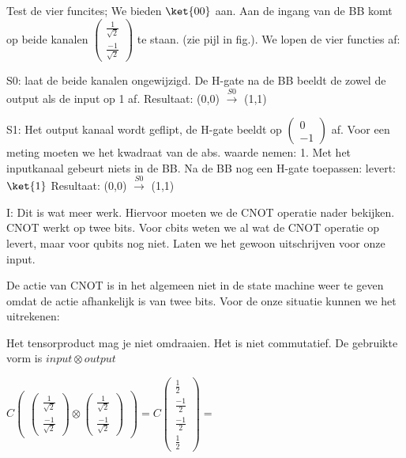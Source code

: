 Test de vier funcites;
We bieden $\ket{00}$ aan.
Aan de ingang van de BB komt op beide kanalen $
\begin{pmatrix} \tfrac{1}{\sqrt{2}}  \\ \tfrac{-1}{\sqrt{2}} \end{pmatrix} $ te staan. (zie pijl in fig.). 
We lopen de vier functies af:

S0: laat de beide kanalen ongewijzigd. De H-gate na de BB beeldt de zowel de output als de input op 1 af.
Resultaat: (0,0) $\overset{S0}{\rightarrow}$ (1,1)

S1: Het output kanaal wordt geflipt, de H-gate beeldt op $
\begin{pmatrix} 0 \\ -1 \end{pmatrix}$ af. Voor een meting moeten we het kwadraat van de abs. waarde nemen: 1.
Met het inputkanaal gebeurt niets in de BB. Na de BB nog een H-gate toepassen: levert: $\ket{1}$
Resultaat: (0,0) $\overset{S0}{\rightarrow}$ (1,1)

I: Dit is wat meer werk. Hiervoor moeten we de CNOT operatie nader bekijken. CNOT werkt op twee bits. Voor cbits weten we al wat de CNOT operatie op levert, maar voor qubits nog niet. Laten we het gewoon uitschrijven voor onze input. 

De actie van CNOT is in het algemeen niet in de state machine weer te geven omdat de actie afhankelijk is van twee bits. Voor de onze situatie kunnen we het uitrekenen:

Het tensorproduct mag je niet omdraaien. Het is niet commutatief. De gebruikte vorm is $input \otimes output$

$
C\begin{pmatrix}
\begin{pmatrix} \tfrac{1}{\sqrt{2}}  \\ \tfrac{-1}{\sqrt{2}} \end{pmatrix}
\otimes
\begin{pmatrix} \tfrac{1}{\sqrt{2}}  \\ \tfrac{-1}{\sqrt{2}} \end{pmatrix}
\end{pmatrix}
=
C
\begin{pmatrix}
\tfrac{1}{2}\\
\tfrac{-1}{2}\\
\tfrac{-1}{2}\\
\tfrac{1}{2}
\end{pmatrix}
=
$

